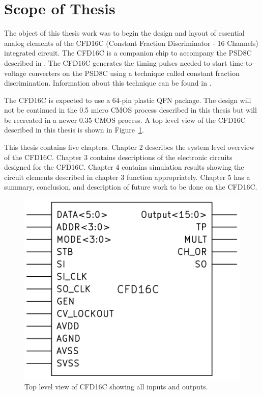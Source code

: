 \documentclass[12pt,oneside,final]{siuethesis}
\theoremstyle{definition}
\begin{document}
\section{Scope of Thesis}
\par The object of this thesis work was to begin the design and layout of essential analog elements of the CFD16C (Constant Fraction Discriminator - 16 Channels) integrated circuit. The CFD16C is a companion chip to accompany the PSD8C described in \cite{PROCTOR}. The CFD16C generates the timing pulses needed to start time-to-voltage converters on the PSD8C using a technique called constant fraction discrimination. Information about this technique can be found in \cite{NOWLIN}.
\par The CFD16C is expected to use a 64-pin plastic QFN package. The design will not be continued in the 0.5 micro CMOS process described in this thesis but will be recreated in a newer 0.35 CMOS process. A top level view of the CFD16C described in this thesis is shown in Figure~\ref{fig:CFDtop}.
\par This thesis contains five chapters. Chapter 2 describes the system level overview of the CFD16C. Chapter 3 contains descriptions of the electronic circuits designed for the CFD16C. Chapter 4 contains simulation results showing the circuit elements described in chapter 3 function appropriately. Chapter 5 has a summary, conclusion, and description of future work to be done on the CFD16C.
\vspace{0.25in}
\begin{figure}[ht]
\centering
\includegraphics[scale=1,keepaspectratio=true]{images/CFDtop.png} 
\caption{Top level view of CFD16C showing all inputs and outputs.}
\label{fig:CFDtop}
\end{figure}
\end{document}
